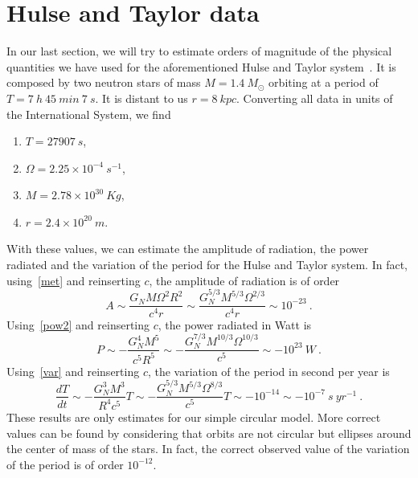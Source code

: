 \documentclass[a4paper]{article}
\newcommand{\dv}[2]{\frac{d#1}{d#2}}
\begin{document}
\section{Hulse and Taylor data}

    In our last section, we will try to estimate orders of magnitude of the physical quantities we have used for the aforementioned Hulse and Taylor system~\cite{schutz}. It is composed by two neutron stars of mass $M = 1.4 ~ M_{\odot}$ orbiting at a period of $T = 7 ~ h ~ 45 ~ min ~ 7 ~ s$. It is distant to us $r = 8 ~kpc$. Converting all data in units of the International System, we find 
    \begin{enumerate}
        \item $T = 27907 ~ s$, 
        \item $\Omega = 2.25 \times 10^{-4} ~ s^{-1}$,
        \item $M = 2.78\times 10^{30} ~ Kg$,
        \item $r = 2.4 \times 10^{20} ~ m$.
    \end{enumerate}
    With these values, we can estimate the amplitude of radiation, the power radiated and the variation of the period for the Hulse and Taylor system. In fact, using~\eqref{met} and reinserting $c$, the amplitude of radiation is of order 
    \begin{equation*}
        A \sim \frac{G_N M \Omega^2 R^2}{c^4 r} \sim \frac{G_N^{5/3} M^{5/3} \Omega^{2/3}}{c^4 r} \sim 10^{-23} ~.
    \end{equation*}
    Using~\eqref{pow2} and reinserting $c$, the power radiated in Watt is
    \begin{equation*}
        P \sim - \frac{G_N^4 M^5}{c^5 R^5} \sim - \frac{G_N^{7/3}M^{10/3}\Omega^{10/3}}{c^5} \sim - 10^{23} ~ W ~.
    \end{equation*}
    Using~\eqref{var} and reinserting $c$, the variation of the period in second per year is
    \begin{equation*}
        \dv{T}{t} \sim - \frac{G_N^3 M^3}{R^4 c^5} T \sim - \frac{G_N^{5/3} M^{5/3} \Omega^{8/3}}{c^5}T \sim - 10^{-14} \sim - 10^{-7} ~ s ~ yr^{-1} ~.
    \end{equation*}
    These results are only estimates for our simple circular model. More correct values can be found by considering that orbits are not circular but ellipses around the center of mass of the stars. In fact, the correct observed value of the variation of the period is of order $10^{-12}$. 

\printbibliography
\end{document}
